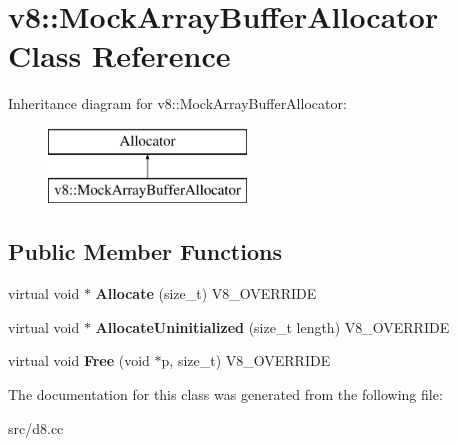 \hypertarget{classv8_1_1_mock_array_buffer_allocator}{}\section{v8\+:\+:Mock\+Array\+Buffer\+Allocator Class Reference}
\label{classv8_1_1_mock_array_buffer_allocator}
Inheritance diagram for v8\+:\+:Mock\+Array\+Buffer\+Allocator\+:\begin{figure}[H]
\begin{center}
\leavevmode
\includegraphics[height=2.000000cm]{classv8_1_1_mock_array_buffer_allocator}
\end{center}
\end{figure}
\subsection*{Public Member Functions}
\begin{DoxyCompactItemize}
\item 
\hypertarget{classv8_1_1_mock_array_buffer_allocator_a2b05404f82446cdcf38595f9aac1b9cd}{}virtual void $\ast$ {\bfseries Allocate} (size\+\_\+t) V8\+\_\+\+O\+V\+E\+R\+R\+I\+D\+E\label{classv8_1_1_mock_array_buffer_allocator_a2b05404f82446cdcf38595f9aac1b9cd}

\item 
\hypertarget{classv8_1_1_mock_array_buffer_allocator_a93387407d18a1f03e1204a81736bf225}{}virtual void $\ast$ {\bfseries Allocate\+Uninitialized} (size\+\_\+t length) V8\+\_\+\+O\+V\+E\+R\+R\+I\+D\+E\label{classv8_1_1_mock_array_buffer_allocator_a93387407d18a1f03e1204a81736bf225}

\item 
\hypertarget{classv8_1_1_mock_array_buffer_allocator_ac870c002ec88ef0fef34194741f1ade2}{}virtual void {\bfseries Free} (void $\ast$p, size\+\_\+t) V8\+\_\+\+O\+V\+E\+R\+R\+I\+D\+E\label{classv8_1_1_mock_array_buffer_allocator_ac870c002ec88ef0fef34194741f1ade2}

\end{DoxyCompactItemize}


The documentation for this class was generated from the following file\+:\begin{DoxyCompactItemize}
\item 
src/d8.\+cc\end{DoxyCompactItemize}
